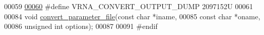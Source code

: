 \begin{DoxyCode}
00059 
\hypertarget{convert__epars_8h_source.tex_l00060}{}\hyperlink{group__energy__parameters__convert_gac86976e9c2a55b3a6481ea60044f6098}{00060} \textcolor{preprocessor}{#define VRNA\_CONVERT\_OUTPUT\_DUMP          2097152U}
00061 
00084 \textcolor{keywordtype}{void} \hyperlink{group__energy__parameters__convert_gafbe538bc4eb2cf2a33326e1010005f8a}{convert\_parameter\_file}(\textcolor{keyword}{const} \textcolor{keywordtype}{char} *iname,
00085                             \textcolor{keyword}{const} \textcolor{keywordtype}{char} *oname,
00086                             \textcolor{keywordtype}{unsigned} \textcolor{keywordtype}{int} options);
00087 
00091 \textcolor{preprocessor}{#endif}
\end{DoxyCode}
